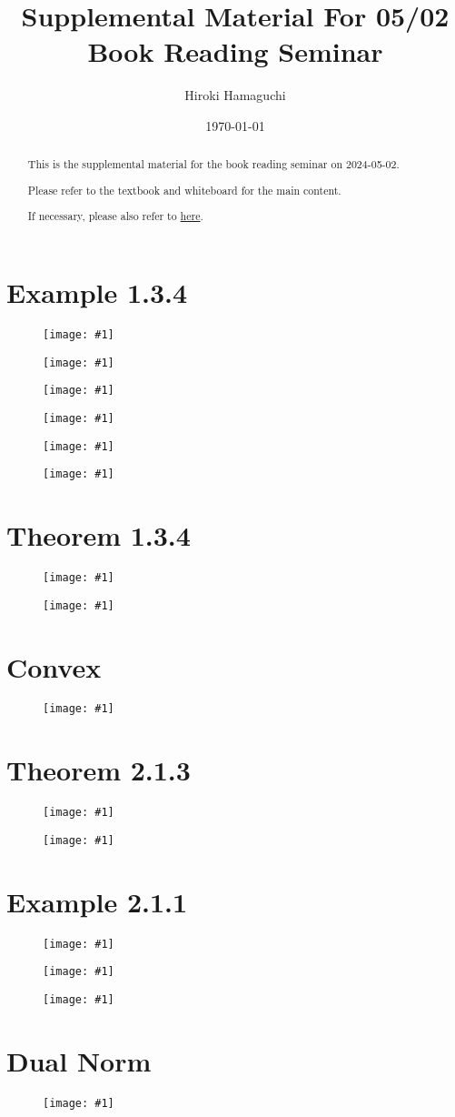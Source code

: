 \documentclass[a4paper, 10pt, dvipdfmx]{article}
\newcommand{\IMG}[2]{
    \begin{figure}[H]
        \centering
        \texttt{[image: \#1]}
        \caption{}
    \end{figure}
}
\begin{document}
\title{Supplemental Material For 05/02 Book Reading Seminar}
\author{Hiroki Hamaguchi}
\date{\today}
\maketitle

\begin{abstract}
    \begin{center}
        This is the supplemental material for the book reading seminar on 2024-05-02.

        Please refer to the textbook and whiteboard for the main content.

        If necessary, please also refer to \href{https://github.com/hari64boli64/BookReadingSeminarOn20240502}{here}.
    \end{center}
\end{abstract}

\section*{Example 1.3.4}
\IMG{example1.3.4_f1.png}{0.6}
\IMG{example1.3.4_quadraticPenalty.png}{0.6}
\IMG{example1.3.4_nonSmoothPenalty.png}{0.6}
\IMG{example1.3.4_powerFunctionBarrier_withP2.png}{0.6}
\IMG{example1.3.4_logarithmicBarrier.png}{0.6}
\IMG{example1.3.4_exponentialBarrier.png}{0.6}

\section*{Theorem 1.3.4}
\IMG{theorem1.3.4_(x-2)^2.png}{0.6}
\IMG{theorem1.3.4_(x-8)^2.png}{0.6}

\section*{Convex}
\IMG{convex.png}{0.8}

\section*{Theorem 2.1.3}
\IMG{theorem2.1.3_1d.png}{0.8}
\IMG{theorem2.1.3_2d.png}{0.8}

\section*{Example 2.1.1}
\IMG{example2.1.1_2.png}{0.6}
\IMG{example2.1.1_3.png}{0.6}
\IMG{example2.1.1_3d.png}{0.7}

\section*{Dual Norm}
\IMG{dualNorm.png}{0.8}
\end{document}

